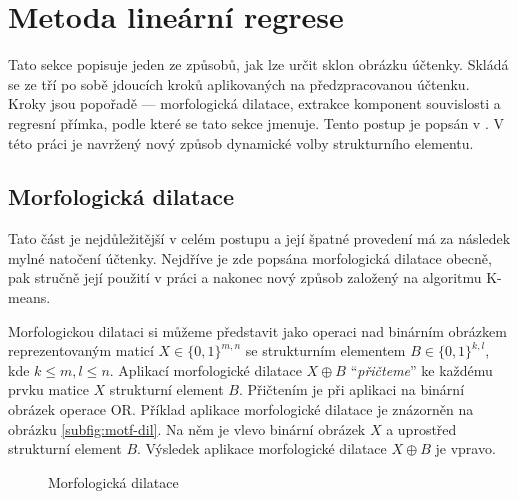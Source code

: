 \documentclass[thesis=B,czech]{FITthesis}[2019/12/23]
\begin{document}
\section{Metoda lineární regrese}
\label{sec:linear-regression-method}
Tato sekce popisuje jeden ze způsobů, jak lze určit sklon obrázku účtenky. Skládá se ze tří po sobě jdoucích kroků aplikovaných na předzpracovanou účtenku. Kroky jsou popořadě — morfologická dilatace, extrakce komponent souvislosti a regresní přímka, podle které se tato sekce jmenuje. Tento postup je popsán v  \cite{Brodic2012}. V této práci je navržený nový způsob dynamické volby strukturního elementu.

\subsection{Morfologická dilatace}
Tato část je nejdůležitější v celém postupu a její špatné provedení má za následek mylné natočení účtenky. Nejdříve je zde popsána morfologická dilatace obecně, pak stručně její použití v práci  \cite{Brodic2012} a nakonec nový způsob založený na algoritmu K-means.

Morfologickou dilataci si můžeme představit jako operaci nad binárním obrázkem reprezentovaným maticí $X \in \{0, 1\}^{m, n}$ se strukturním elementem $B \in \{0, 1\}^{k, l}$, kde $k \leq m, l \leq n$. Aplikací morfologické dilatace $X \oplus B$ \enquote{\textit{přičteme}} ke každému prvku matice $X$ strukturní element $B$. Přičtením je při aplikaci na binární obrázek operace OR. Příklad aplikace morfologické dilatace je znázorněn na obrázku \ref{subfig:motf-dil}. Na něm je vlevo binární obrázek $X$ a uprostřed strukturní element $B$. Výsledek aplikace morfologické dilatace $X \oplus B$ je vpravo.

\begin{figure}[!ht]%
	\centering
	\hspace{1pt}
	\caption{Morfologická dilatace}
	\label{fig:morf-dilatace}%
\end{figure}
\end{document}
